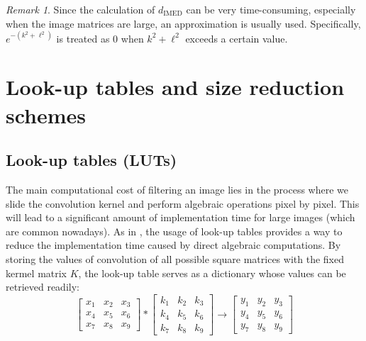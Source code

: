 \documentclass[12pt]{amsart}
\theoremstyle{definition}
\theoremstyle{remark}
\newtheorem{rem}[thm]{Remark}
\numberwithin{thm}{section}
\begin{document}
\begin{rem}
Since the calculation of $d_\text{IMED}$ can be very time-consuming, especially when the image matrices are large, an approximation is usually used. Specifically, $e^{-(k^2+\ell^2)}$ is treated as 0 when $k^2+\ell^2$ exceeds a certain value.
\end{rem}



\section{Look-up tables and size reduction schemes}\label{section: look-up table}

\subsection{Look-up tables (LUTs)}
The main computational cost of filtering an image lies in the process where we slide the convolution kernel and perform algebraic operations pixel by pixel. This will lead to a significant amount of implementation time for large images (which are common nowadays). As in \cite{WSLQE06}, 
the usage of look-up tables %
provides a way to reduce the implementation time caused by direct algebraic computations. By storing the values of convolution of all possible square matrices with the fixed kermel matrix $K$, the look-up table serves as a dictionary whose values can be retrieved readily:   
$$
\begin{bmatrix}
x_1 & x_2 & x_3\\
x_4 & x_5 & x_6\\
x_7 & x_8 & x_9
\end{bmatrix}
*
\begin{bmatrix}
k_1 & k_2 & k_3\\
k_4 & k_5 & k_6\\
k_7 & k_8 & k_9
\end{bmatrix}
\longrightarrow
\begin{bmatrix}
y_1 & y_2 & y_3\\
y_4 & y_5 & y_6\\
y_7 & y_8 & y_9
\end{bmatrix}
$$
\end{document}
